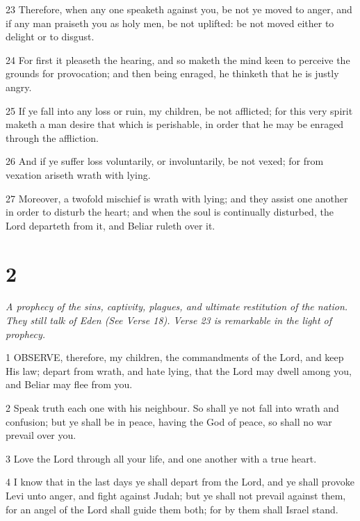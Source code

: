 \par 23 Therefore, when any one speaketh against you, be not ye moved to anger, and if any man praiseth you as holy men, be not uplifted: be not moved either to delight or to disgust.

\par 24 For first it pleaseth the hearing, and so maketh the mind keen to perceive the grounds for provocation; and then being enraged, he thinketh that he is justly angry.

\par 25 If ye fall into any loss or ruin, my children, be not afflicted; for this very spirit maketh a man desire that which is perishable, in order that he may be enraged through the affliction.

\par 26 And if ye suffer loss voluntarily, or involuntarily, be not vexed; for from vexation ariseth wrath with lying.

\par 27 Moreover, a twofold mischief is wrath with lying; and they assist one another in order to disturb the heart; and when the soul is continually disturbed, the Lord departeth from it, and Beliar ruleth over it.



\chapter{2}

\par \textit{A prophecy of the sins, captivity, plagues, and ultimate restitution of the nation. They still talk of Eden (See Verse 18). Verse 23 is remarkable in the light of prophecy.}

\par 1 OBSERVE, therefore, my children, the commandments of the Lord, and keep His law; depart from wrath, and hate lying, that the Lord may dwell among you, and Beliar may flee from you.

\par 2 Speak truth each one with his neighbour. So shall ye not fall into wrath and confusion; but ye shall be in peace, having the God of peace, so shall no war prevail over you.

\par 3 Love the Lord through all your life, and one another with a true heart.

\par 4 I know that in the last days ye shall depart from the Lord, and ye shall provoke Levi unto anger, and fight against Judah; but ye shall not prevail against them, for an angel of the Lord shall guide them both; for by them shall Israel stand.


